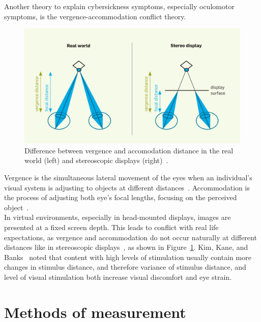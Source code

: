 Another theory to explain cybersickness symptoms, especially oculomotor symptoms, is the \mbox{vergence-accommodation}
conflict theory.
\\
\begin{figure}[h]
    \centering
    \includegraphics[width=\textwidth/2]{content/2_related_work/img/VergenceAccommodation[Kroeker2010]}
    \caption{Difference between vergence and accomodation distance in the real world (left) and stereoscopic displays
        (right)~\cite{Kroeker2010}.}
    \label{fig:vergence-accommodation-differences}
\end{figure}
Vergence is the simultaneous lateral movement of the eyes when an individual's visual system is adjusting to objects
at different distances~\cite{Kim2014}.
Accommodation is the process of adjusting both eye's focal lengths, focusing on the perceived
object~\cite{Rebenitsch2016}.
\\
In virtual environments, especially in head-mounted displays, images are presented at a fixed screen depth.
This leads to conflict with real life expectations, as vergence and accommodation do not occur naturally at
different distances like in stereoscopic displays~\cite{Saredakis2020}, as shown in
Figure~\ref{fig:vergence-accommodation-differences}.
Kim, Kane, and Banks~\cite{Kim2014} noted that content with high levels of stimulation usually contain more changes
in stimulus distance, and therefore variance of stimulus distance, and level of visual stimulation both increase visual
discomfort and eye strain.


\section{Methods of measurement}\label{sec:methods-of-measurement}

